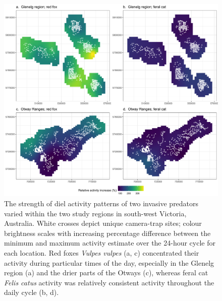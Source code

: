 \documentclass[11pt,a4paper,titlepage,twoside,openright]{style/unimelbthesis}
\begin{document}
\begin{mainmatter}
\newpage
\begin{figure}

{\centering \includegraphics[width=1\linewidth]{figure/diel_strength_600dpi} 

}

\caption{The strength of diel activity patterns of two invasive predators varied within the two study regions in south-west Victoria, Australia. White crosses depict unique camera-trap sites; colour brightness scales with increasing percentage difference between the minimum and maximum activity estimate over the 24-hour cycle for each location. Red foxes \textit{Vulpes vulpes} (a, c) concentrated their activity during particular times of the day, especially in the Glenelg region (a) and the drier parts of the Otways (c), whereas feral cat \textit{Felis catus} activity was relatively consistent activity throughout the daily cycle (b, d).}\label{fig:diel-space}
\end{figure}
\newpage
\begin{figure}


\end{figure}
\end{mainmatter}
\end{document}
